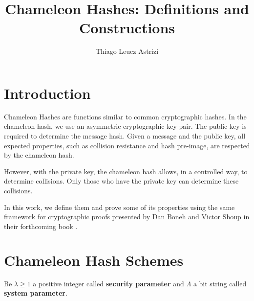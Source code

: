 \documentclass[a4paper]{article}
\title{Chameleon Hashes: Definitions and Constructions}
\author{Thiago Leucz Astrizi}
\begin{document}
 
 \maketitle

\tableofcontents

\section{Introduction}
 
 

Chameleon Hashes are functions similar to common cryptographic hashes. In the chameleon hash, we use an asymmetric cryptographic key pair. The public key is required to determine the message hash. Given a message and the public key, all expected properties, such as collision resistance and hash pre-image, are respected by the chameleon hash.

However, with the private key, the chameleon hash allows, in a controlled way, to determine collisions. Only those who have the private key can determine these collisions.
 
In this work, we define them and prove some of its properties using the same framework for cryptographic proofs presented by Dan Boneh and Victor Shoup in their forthcoming book \cite{boneh2020graduate}.
 
\section{Chameleon Hash Schemes}
\label{sec:chameleon:hash}

Be $\lambda \geq 1$ a positive integer called \textbf{security parameter} and $\Lambda$ a bit string called \textbf{system parameter}. 
 
\end{document}
